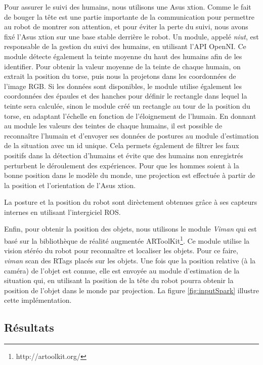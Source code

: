 \documentclass[a4paper,11pt,twoside]{StyleThese}
\begin{document}
Pour assurer le suivi des humains, nous utilisons une Asus xtion. Comme le fait de bouger la tête est une partie importante de la communication pour permettre au robot de montrer son attention, et pour éviter la perte du suivi, nous avons fixé l'Asus xtion sur une base stable derrière le robot.
Un module, appelé \textit{niut}, est responsable de la gestion du suivi des humains, en utilisant l'API OpenNI. Ce module détecte également la teinte moyenne du haut des humains afin de les identifier. Pour obtenir la valeur moyenne de la teinte de chaque humain, on extrait la position du torse, puis nous la projetons dans les coordonnées de l'image RGB. Si les données sont disponibles, le module utilise également les coordonnées des épaules et des hanches pour définir le rectangle dans lequel la teinte sera calculée, sinon le module créé un rectangle au tour de la position du torse, en adaptant l'échelle en fonction de l'éloignement de l'humain.
En donnant au module les valeurs des teintes de chaque humains, il est possible de reconnaître l'humain et d'envoyer ses données de postures au module d'estimation de la situation avec un id unique. Cela permets également de filtrer les faux positifs dans la détection d'humains et évite que des humains non enregistrés perturbent le déroulement des expériences.
Pour que les hommes soient à la bonne position dans le modèle du monde, une projection est effectuée à partir de la position et l'orientation de l'Asus xtion.

La posture et la position du robot sont dirèctement obtenues grâce à ses capteurs internes en utilisant l'intergiciel ROS.

Enfin, pour obtenir la position des objets, nous utilisons le module \textit{Viman} qui est basé sur la bibliothèque de réalité augmentée ARToolKit\footnote{http://artoolkit.org/}. Ce module utilise la vision stéréo du robot pour reconnaître et localiser les objets. Pour ce faire, \textit{viman} scan des RTags placés sur les objets.
Une fois que la position relative (à la caméra) de l'objet est connue, elle est envoyée au module d'estimation de la situation qui, en utilisant la position de la tête du robot pourra obtenir la position de l'objet dans le monde par projection.
La figure \ref{fig:inputSpark} illustre cette implémentation.


\subsection{Résultats}
\label{sec:ResChap2}
\end{document}
